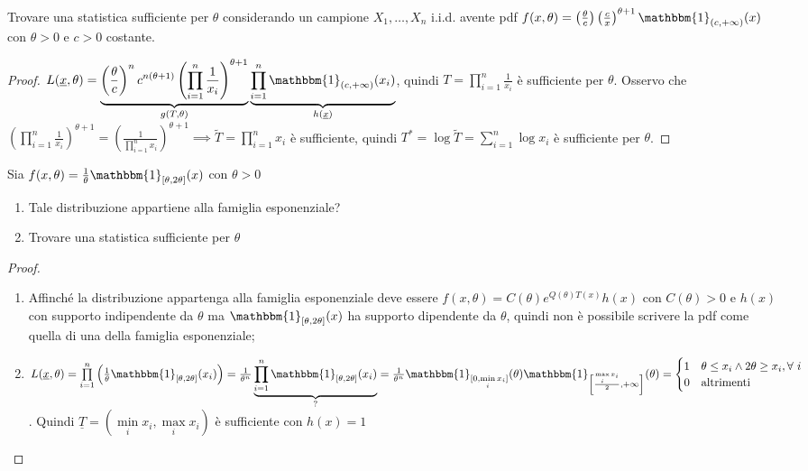 \documentclass[hidelinks, 10pt]{report}
\begin{document}
\begin{ex}
Trovare una statistica sufficiente per $ \theta $ considerando un campione $ X_1, \dotsc, X_n $ i.i.d. avente pdf $ f(x, \theta) = \left( \frac{\theta}{c} \right) \left( \frac{c}{x} \right)^{\theta + 1} \mathbbm{1}_{(c, +\infty)} (x) $ con $ \theta > 0 $ e $ c > 0 $ costante.
\end{ex}

\begin{proof}
$ L(\underline{x}, \theta) = \underbrace{\left( \frac{\theta}{c} \right)^{n} c^{n(\theta + 1)} \left( \prod\limits_{i = 1}^{n} \frac{1}{x_i} \right)^{\theta + 1}}_{g(T, \theta)} \underbrace{\prod\limits_{i = 1}^{n} \mathbbm{1}_{(c, +\infty)} (x_i)}_{h(\underline{x})} $, quindi $ T = \prod\limits_{i = 1}^{n} \frac{1}{x_i} $ \`e sufficiente per $ \theta $. Osservo che $ \left( \prod\limits_{i = 1}^{n} \frac{1}{x_i} \right)^{\theta + 1} = \left( \frac{1}{\prod\limits_{i = 1}^{n} x_i} \right)^{\theta + 1} \implies \tilde{T} = \prod\limits_{i = 1}^{n} x_i $ \`e sufficiente, quindi $ T^{\ast} = \log \tilde{T} = \sum\limits_{i = 1}^{n} \log x_i $ \`e sufficiente per $ \theta $.
\end{proof}

\begin{ex}
Sia $ f(x, \theta) = \frac{1}{\theta} \mathbbm{1}_{[\theta, 2 \theta]} (x) $ con $ \theta > 0 $
\begin{enumerate}
\item Tale distribuzione appartiene alla famiglia esponenziale?
\item Trovare una statistica sufficiente per $ \theta $
\end{enumerate}
\end{ex}

\begin{proof}
\noindent
\begin{enumerate}
\item Affinch\'e la distribuzione appartenga alla famiglia esponenziale deve essere $ {f(x, \theta) = C(\theta) e^{Q(\theta) T(x)} h(x)} $ con $ C(\theta) > 0 $ e $ h(x) $ con supporto indipendente da $ \theta $ ma $ \mathbbm{1}_{[\theta, 2 \theta]} (x) $ ha supporto dipendente da $ \theta $, quindi non \`e possibile scrivere la pdf come quella di una della famiglia esponenziale;
\item $ L(\underline{x}, \theta) = \prod\limits_{i = 1}^{n} \left( \frac{1}{\theta} \mathbbm{1}_{[\theta, 2 \theta]} (x_i) \right) = \frac{1}{\theta^n} \underbrace{\prod\limits_{i = 1}^{n} \mathbbm{1}_{[\theta, 2 \theta]} (x_i)}_{?} = \frac{1}{\theta^{n}} \mathbbm{1}_{[0, \min\limits_{i} x_i]} (\theta) \mathbbm{1}_{\left[ \frac{\max\limits_{i} x_i}{2}, +\infty \right]} (\theta) = \begin{cases} 1 & \theta \le x_i \land 2 \theta \ge x_i, \forall\ i \\ 0 & \text{altrimenti} \end{cases} $. Quindi $ \underline{T} = (\min\limits_{i} x_i, \max\limits_{i} x_i) $ \`e sufficiente con $ h(x) = 1 $
\end{enumerate}
\end{proof}
\end{document}
